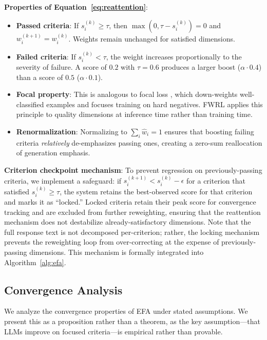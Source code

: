 \documentclass[11pt]{article}
\newcommand{\efa}{\textsc{EFA}}  %
\newcommand{\fwrl}{\textsc{FWRL}}
\begin{document}
\textbf{Properties of Equation~\ref{eq:reattention}}:
\begin{itemize}[leftmargin=*]
    \item \textbf{Passed criteria}: If $s_i^{(k)} \geq \tau$, then $\max(0, \tau - s_i^{(k)}) = 0$ and $w_i^{(k+1)} = w_i^{(k)}$. Weights remain unchanged for satisfied dimensions.
    \item \textbf{Failed criteria}: If $s_i^{(k)} < \tau$, the weight increases proportionally to the severity of failure. A score of $0.2$ with $\tau = 0.6$ produces a larger boost ($\alpha \cdot 0.4$) than a score of $0.5$ ($\alpha \cdot 0.1$).
    \item \textbf{Focal property}: This is analogous to focal loss \citep{lin2017focal}, which down-weights well-classified examples and focuses training on hard negatives. \fwrl{} applies this principle to quality dimensions at inference time rather than training time.
    \item \textbf{Renormalization}: Normalizing to $\sum_i \hat{w}_i = 1$ ensures that boosting failing criteria \emph{relatively} de-emphasizes passing ones, creating a zero-sum reallocation of generation emphasis.
\end{itemize}

\textbf{Criterion checkpoint mechanism}: To prevent regression on previously-passing criteria, we implement a safeguard: if $s_i^{(k+1)} < s_i^{(k)} - \epsilon$ for a criterion that satisfied $s_i^{(k)} \geq \tau$, the system retains the best-observed score for that criterion and marks it as ``locked.'' Locked criteria retain their peak score for convergence tracking and are excluded from further reweighting, ensuring that the reattention mechanism does not destabilize already-satisfactory dimensions. Note that the full response text is not decomposed per-criterion; rather, the locking mechanism prevents the reweighting loop from over-correcting at the expense of previously-passing dimensions. This mechanism is formally integrated into Algorithm~\ref{alg:efa}.

\subsection{Convergence Analysis}
\label{sec:convergence}

We analyze the convergence properties of \efa{} under stated assumptions. We present this as a proposition rather than a theorem, as the key assumption---that LLMs improve on focused criteria---is empirical rather than provable.
\end{document}
